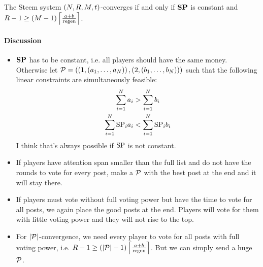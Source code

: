 \begin{theorem}
  The Steem system $\left(\playerlen, \rounds, \postlen, t\right)$-converges if
  and only if $\stpowvec$ is constant and $\rounds - 1 \geq \left(\postlen -
  1\right) \ceil*{\frac{a + b}{\regen}}$.
\end{theorem}

  \paragraph{Discussion}
    \begin{itemize}
      \item $\stpowvec$ has to be constant, i.e. all players should have the
      same money. Otherwise let $\postlist = \left(\left(1, \left(a_1, \dots,
      a_\playerlen\right)\right), \left(2, \left(b_1, \dots,
      b_\playerlen\right)\right)\right)$ such that the following linear
      constraints are simultaneously feasible:
      \begin{gather*}
        \sum\limits_{i=1}^\playerlen a_i > \sum\limits_{i=1}^\playerlen b_i \\
        \sum\limits_{i=1}^\playerlen \stpow_i a_i < \sum\limits_{i=1}^\playerlen
        \stpow_i  b_i \\
      \end{gather*}
      I think that's always possible if $\stpow$ is not constant.
      \item If players have attention span smaller than the full list and do not
      have the rounds to vote for every post, make a $\postlist$ with the best
      post at the end and it will stay there.
      \item If players must vote without full voting power but have the time to
      vote for all posts, we again place the good posts at the end. Players will
      vote for them with little voting power and they will not rise to the top.
      \item For $|\postlist|$-convergence, we need every player to vote for all
      posts with full voting power, i.e. $\rounds - 1 \geq \left(|\postlist| -
      1\right) \ceil*{\frac{a + b}{\regen}}$. But we can simply send a huge
      $\postlist$.
    \end{itemize}
